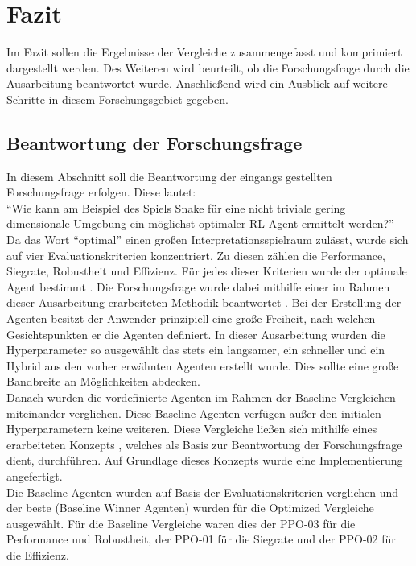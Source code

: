 \chapter{Fazit}
Im Fazit sollen die Ergebnisse der Vergleiche  zusammengefasst und komprimiert dargestellt werden. Des Weiteren wird beurteilt, ob die Forschungsfrage  durch die Ausarbeitung beantwortet wurde.
Anschließend wird ein Ausblick auf weitere Schritte in diesem Forschungsgebiet gegeben.

\section{Beantwortung der Forschungsfrage}
In diesem Abschnitt soll die Beantwortung der eingangs gestellten Forschungsfrage erfolgen. Diese lautet:\\
"`Wie kann am Beispiel des Spiels Snake für eine nicht triviale gering dimensionale Umgebung ein möglichst optimaler RL Agent ermittelt werden?"'\\
Da das Wort "`optimal"' einen großen Interpretationsspielraum zulässt, wurde sich auf vier Evaluationskriterien konzentriert. Zu diesen zählen die Performance, Siegrate, Robustheit und Effizienz. Für jedes dieser Kriterien wurde der optimale Agent bestimmt .
Die Forschungsfrage wurde dabei mithilfe einer im Rahmen dieser Ausarbeitung erarbeiteten Methodik beantwortet .
Bei der Erstellung der Agenten besitzt der Anwender prinzipiell eine große Freiheit, nach welchen Gesichtspunkten er die Agenten definiert. In dieser Ausarbeitung wurden die Hyperparameter so ausgewählt das stets ein langsamer, ein schneller und ein Hybrid aus den vorher erwähnten Agenten erstellt wurde. Dies sollte eine große Bandbreite an Möglichkeiten abdecken.\\
Danach wurden die vordefinierte Agenten im Rahmen der Baseline Vergleichen miteinander verglichen. Diese Baseline Agenten verfügen außer den initialen Hyperparametern keine weiteren.
Diese Vergleiche ließen sich mithilfe eines erarbeiteten Konzepts , welches als Basis zur Beantwortung der Forschungsfrage dient, durchführen. Auf Grundlage dieses Konzepts wurde eine Implementierung  angefertigt.\\
Die Baseline Agenten wurden auf Basis der Evaluationskriterien verglichen und der beste (Baseline Winner Agenten) wurden für die Optimized Vergleiche ausgewählt. Für die Baseline Vergleiche waren dies der PPO-03 für die Performance und Robustheit, der PPO-01 für die Siegrate und der PPO-02 für die Effizienz.\\
